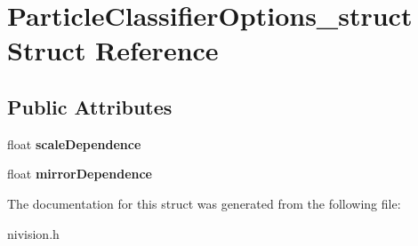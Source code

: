 \hypertarget{structParticleClassifierOptions__struct}{
\section{ParticleClassifierOptions\_\-struct Struct Reference}
\label{structParticleClassifierOptions__struct}
}
\subsection*{Public Attributes}
\begin{DoxyCompactItemize}
\item 
\hypertarget{structParticleClassifierOptions__struct_a792a1326f881c22c9a3fc6a62882d969}{
float {\bfseries scaleDependence}}
\label{structParticleClassifierOptions__struct_a792a1326f881c22c9a3fc6a62882d969}

\item 
\hypertarget{structParticleClassifierOptions__struct_a794f85fc9d569be0a035dcacd467c588}{
float {\bfseries mirrorDependence}}
\label{structParticleClassifierOptions__struct_a794f85fc9d569be0a035dcacd467c588}

\end{DoxyCompactItemize}


The documentation for this struct was generated from the following file:\begin{DoxyCompactItemize}
\item 
nivision.h\end{DoxyCompactItemize}
